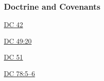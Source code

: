 	\subsubsection{Doctrine and Covenants} %
		\label{CONSECRATION-DC}
	
		
		\begin{compactdesc}
			\item[{\hyperref[DC42]{DC 42}}] 
			\item[{\hyperref[DC49-20]{DC 49:20}}] 
			\item[{\hyperref[DC51]{DC 51}}] 
			\item[{\hyperref[DC78-5]{DC 78:5--6}}] 
		\end{compactdesc}
		
	
		
		

	
